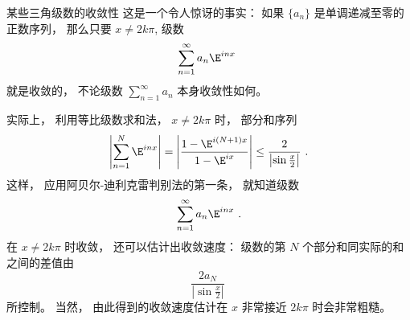\begin{example}{某些三角级数的收敛性}
这是一个令人惊讶的事实： 如果 $\{a_n\}$ 是单调递减至零的正数序列， 那么只要 $x\neq 2k\pi$, 级数
$$
\sum_{n=1}^\infty a_n \E^{inx}~
$$
就是收敛的， 不论级数 $\sum_{n=1}^\infty a_n$ 本身收敛性如何。

实际上， 利用等比级数求和法， $x\neq 2k\pi$ 时， 部分和序列
$$
\left|\sum_{n=1}^N\E^{inx}\right|
=\left|\frac{1-\E^{i(N+1)x}}{1-\E^{ix}}\right|
\leq\frac{2}{\left|\sin\frac{x}{2}\right|}~.
$$
这样， 应用阿贝尔-迪利克雷判别法的第一条， 就知道级数
$$
\sum_{n=1}^\infty a_n \E^{inx}~.
$$
在 $x\neq 2k\pi$ 时收敛， 还可以估计出收敛速度： 级数的第 $N$ 个部分和同实际的和之间的差值由
$$
\frac{2a_N}{\left|\sin\frac{x}{2}\right|}~
$$
所控制。 当然， 由此得到的收敛速度估计在 $x$ 非常接近 $2k\pi$ 时会非常粗糙。
\end{example}
